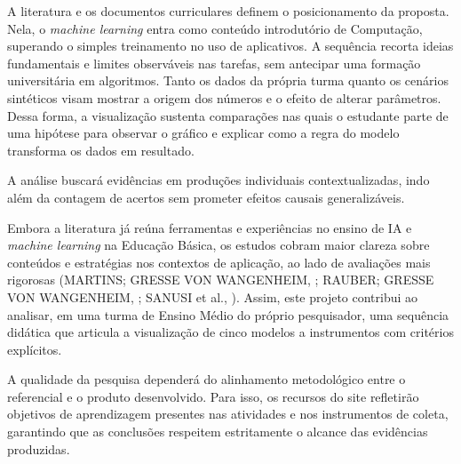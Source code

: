 A literatura e os documentos curriculares definem o posicionamento da proposta. Nela, o \textit{machine learning} entra como conteúdo introdutório de Computação, superando o simples treinamento no uso de aplicativos. A sequência recorta ideias fundamentais e limites observáveis nas tarefas, sem antecipar uma formação universitária em algoritmos. Tanto os dados da própria turma quanto os cenários sintéticos visam mostrar a origem dos números e o efeito de alterar parâmetros. Dessa forma, a visualização sustenta comparações nas quais o estudante parte de uma hipótese para observar o gráfico e explicar como a regra do modelo transforma os dados em resultado.

A análise buscará evidências em produções individuais contextualizadas, indo além da contagem de acertos sem prometer efeitos causais generalizáveis.

Embora a literatura já reúna ferramentas e experiências no ensino de IA e \textit{machine learning} na Educação Básica, os estudos cobram maior clareza sobre conteúdos e estratégias nos contextos de aplicação, ao lado de avaliações mais rigorosas (\MakeUppercase{MARTINS; GRESSE VON WANGENHEIM}, \citeyear{martins2023findings}; \MakeUppercase{RAUBER; GRESSE VON WANGENHEIM}, \citeyear{rauber2023assessing}; \MakeUppercase{SANUSI} et al., \citeyear{sanusi2023systematic}). Assim, este projeto contribui ao analisar, em uma turma de Ensino Médio do próprio pesquisador, uma sequência didática que articula a visualização de cinco modelos a instrumentos com critérios explícitos.

A qualidade da pesquisa dependerá do alinhamento metodológico entre o referencial e o produto desenvolvido. Para isso, os recursos do site refletirão objetivos de aprendizagem presentes nas atividades e nos instrumentos de coleta, garantindo que as conclusões respeitem estritamente o alcance das evidências produzidas.

